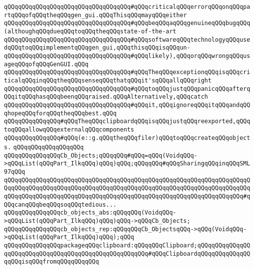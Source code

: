 \verb|qQQqqQQqqQQqqQQqqQQqqQQqqQQqqQQqqQQq#qQQqcriticalqQQqerrorqQQqonqQQqpartqQQqofqQQqtheqQQqgen_gui.qQQqThisqQQqmayqQQqeither|\newline
\verb|qQQqqQQqqQQqqQQqqQQqqQQqqQQqqQQqqQQq#qQQqbeqQQqaqQQqgenuineqQQqbugqQQq(althoughqQQqdueqQQqtoqQQqtheqQQqstate-of-the-art|\newline
\verb|qQQqqQQqqQQqqQQqqQQqqQQqqQQqqQQqqQQq#qQQqsoftwareqQQqtechnologyqQQqusedqQQqtoqQQqimplementqQQqgen_gui,qQQqthisqQQqisqQQqun-|\newline
\verb|qQQqqQQqqQQqqQQqqQQqqQQqqQQqqQQqqQQq#qQQqlikely),qQQqorqQQqwrongqQQqusageqQQqofqQQqGenGUI.qQQq|\newline
\verb|qQQqqQQqqQQqqQQqqQQqqQQqqQQqqQQqqQQq#qQQqTheqQQqexceptionqQQqisqQQqcriticalqQQqinqQQqtheqQQqsenseqQQqthatqQQqit'sqQQqallqQQqright|\newline
\verb|qQQqqQQqqQQqqQQqqQQqqQQqqQQqqQQqqQQq#qQQqtoqQQqjustqQQqpanicqQQqafterqQQqitqQQqhasqQQqbeenqQQqraised.qQQqAlternatively,qQQqcatch|\newline
\verb|qQQqqQQqqQQqqQQqqQQqqQQqqQQqqQQqqQQq#qQQqit,qQQqignoreqQQqitqQQqandqQQqhopeqQQqforqQQqtheqQQqbest.qQQq|\newline
\newline
\newline
\verb|qQQqqQQqqQQqqQQq#qQQqTheqQQqclipboardqQQqisqQQqjustqQQqreexported,qQQqtoqQQqallowqQQqexternalqQQqcomponents|\newline
\verb|qQQqqQQqqQQqqQQq#qQQq(e::g.qQQqtheqQQqfiler)qQQqtoqQQqcreateqQQqobjects.|\newline
\newline
\verb|qQQqqQQqqQQqqQQqqQQq|\newline
\verb|qQQqqQQqqQQqqQQqCb_Objects;qQQqqQQq#qQQq=qQQq(VoidqQQq->qQQqList(qQQqPart_IlkqQQq)qQQq)qQQq;qQQqqQQq#qQQqSharingqQQqinqQQqSML97qQQq|\newline
\verb|qQQqqQQqqQQqqQQqqQQqqQQqqQQqqQQqqQQqqQQqqQQqqQQqqQQqqQQqqQQqqQQqqQQqqQQqqQQqqQQqqQQqqQQqqQQqqQQqqQQqqQQqqQQqqQQqqQQqqQQqqQQqqQQqqQQqqQQqqQQqqQQqqQQqqQQqqQQqqQQqqQQqqQQqqQQqqQQqqQQqqQQqqQQqqQQqqQQqqQQqqQQqqQQq#qQQqcanqQQqbeqQQqsoqQQqtedious...|\newline
\verb|qQQqqQQqqQQqqQQqcb_objects_abs:qQQqqQQq(VoidqQQq->qQQqList(qQQqPart_IlkqQQq)qQQq)qQQq->qQQqCb_Objects;|\newline
\verb|qQQqqQQqqQQqqQQqcb_objects_rep:qQQqqQQqCb_ObjectsqQQq->qQQq(VoidqQQq->qQQqList(qQQqPart_IlkqQQq)qQQq);qQQq|\newline
\newline
\verb|qQQqqQQqqQQqqQQqpackageqQQqclipboard:qQQqqQQqClipboard;qQQqqQQqqQQqqQQqqQQqqQQqqQQqqQQqqQQqqQQqqQQqqQQqqQQqqQQq#qQQqClipboardqQQqqQQqqQQqqQQqqQQqisqQQqfromqQQqqQQqqQQq|\newline

